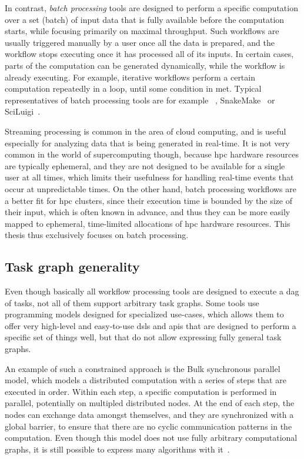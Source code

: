 In contrast, \emph{batch processing} tools are designed to perform a specific computation over a
set (batch) of input data that is fully available before the computation starts, while focusing
primarily on maximal throughput. Such workflows are usually triggered manually by a user once all
the data is prepared, and the workflow stops executing once it has processed all of its inputs. In
certain cases, parts of the computation can be generated dynamically, while the workflow is already
executing. For example, iterative workflows perform a certain computation repeatedly in a loop,
until some condition in met. Typical representatives of batch processing tools are for example
\dask{}~\cite{dask}, SnakeMake~\cite{snakemake} or
SciLuigi~\cite{sciluigi}.

Streaming processing is common in the area of cloud computing, and is useful especially for
analyzing data that is being generated in real-time. It is not very common in the world of
supercomputing though, because \gls{hpc} hardware resources are typically ephemeral,
and they are not designed to be available for a single user at all times, which limits their
usefulness for handling real-time events that occur at unpredictable times. On the other hand,
batch processing workflows are a better fit for \gls{hpc} clusters, since their
execution time is bounded by the size of their input, which is often known in advance, and thus
they can be more easily mapped to ephemeral, time-limited allocations of \gls{hpc}
hardware resources. This thesis thus exclusively focuses on batch processing.

\subsection{Task graph generality}
Even though basically all workflow processing tools are designed to execute a
\gls{dag} of tasks, not all of them support arbitrary task graphs. Some tools use
programming models designed for specialized use-cases, which allows them to offer very high-level
and easy-to-use \glspl{dsl} and \glspl{api} that are designed to perform a
specific set of things well, but that do not allow expressing fully general task graphs.

An example of such a constrained approach is the Bulk synchronous parallel~\cite{bulkparallel1}
model, which models a distributed computation with a series of steps that are executed in order.
Within each step, a specific computation is performed in parallel, potentially on multipled
distributed nodes. At the end of each step, the nodes can exchange data amongst themselves, and
they are synchronized with a global barrier, to ensure that there are no cyclic communication
patterns in the computation. Even though this model does not use fully arbitrary computational
graphs, it is still possible to express many algorithms with it~\cite{bulkparallel2}.

